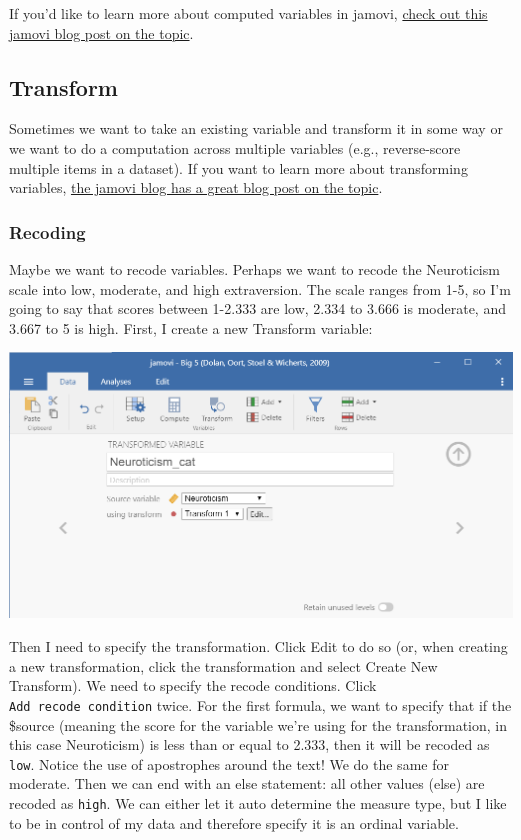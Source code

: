 \documentclass[
]{book}
\begin{document}
If you'd like to learn more about computed variables in jamovi, \href{https://blog.jamovi.org/2017/11/28/jamovi-formulas.html}{check out this jamovi blog post on the topic}.

\hypertarget{transform}{%
\subsection{Transform}\label{transform}}

Sometimes we want to take an existing variable and transform it in some way or we want to do a computation across multiple variables (e.g., reverse-score multiple items in a dataset). If you want to learn more about transforming variables, \href{https://blog.jamovi.org/2018/10/23/transforming-variables.html}{the jamovi blog has a great blog post on the topic}.

\hypertarget{recoding}{%
\subsubsection{Recoding}\label{recoding}}

Maybe we want to recode variables. Perhaps we want to recode the Neuroticism scale into low, moderate, and high extraversion. The scale ranges from 1-5, so I'm going to say that scores between 1-2.333 are low, 2.334 to 3.666 is moderate, and 3.667 to 5 is high. First, I create a new Transform variable:

\includegraphics{images/03-jamovi/transform1.png}

Then I need to specify the transformation. Click Edit to do so (or, when creating a new transformation, click the transformation and select Create New Transform). We need to specify the recode conditions. Click \texttt{Add\ recode\ condition} twice. For the first formula, we want to specify that if the \$source (meaning the score for the variable we're using for the transformation, in this case Neuroticism) is less than or equal to 2.333, then it will be recoded as \texttt{low}. Notice the use of apostrophes around the text! We do the same for moderate. Then we can end with an else statement: all other values (else) are recoded as \texttt{high}. We can either let it auto determine the measure type, but I like to be in control of my data and therefore specify it is an ordinal variable.
\end{document}
